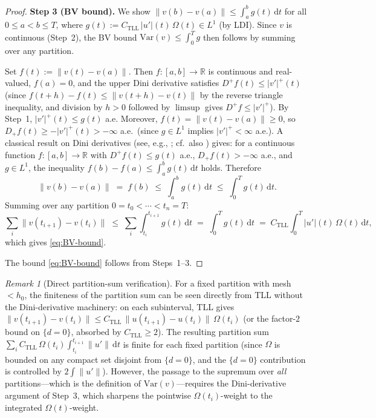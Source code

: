 \documentclass[12pt,a4paper]{article}
\theoremstyle{definition}
\theoremstyle{plain}
\theoremstyle{remark}
\newtheorem{remark}[definition]{Remark}
\newcommand{\Var}{\mathrm{Var}}
\begin{document}
\begin{proof}
\medskip
\noindent
\textbf{Step 3 (BV bound).}\;
We show $\|v(b) - v(a)\| \le \int_a^b g(t)\,\mathrm{d}t$
for all $0 \le a < b \le T$, where
$g(t) := C_{\mathrm{TLL}}\,|u'|(t)\,\Omega(t) \in L^1$
(by LDI).  Since $v$ is continuous (Step~2), the BV bound
$\Var(v) \le \int_0^T g$ then follows by summing over any
partition.

Set $f(t) := \|v(t) - v(a)\|$.  Then $f: [a,b] \to \mathbb{R}$
is continuous and real-valued,
$f(a) = 0$, and the upper Dini derivative satisfies
$D^+ f(t) \le |v'|^+(t)$ (since
$f(t+h) - f(t) \le \|v(t+h)-v(t)\|$ by the reverse triangle
inequality, and division by $h > 0$ followed by
$\limsup$ gives $D^+ f \le |v'|^+$).
By Step~1, $|v'|^+(t) \le g(t)$ a.e.
Moreover, $f(t) = \|v(t) - v(a)\| \ge 0$, so
$D_+ f(t) \ge -|v'|^+(t) > -\infty$ a.e.\ (since $g \in L^1$
implies $|v'|^+ < \infty$ a.e.).  A classical result on Dini
derivatives (see, e.g.,
\cite[Chapter~VII, \S\S\,9--10]{Saks1937}; cf.\ also
\cite[Chapter~3]{AmbrosioFuscoPallara2000}) gives:
for a continuous function $f:[a,b] \to \mathbb{R}$ with
$D^+ f(t) \le g(t)$ a.e., $D_+ f(t) > -\infty$ a.e., and
$g \in L^1$, the inequality
$f(b) - f(a) \le \int_a^b g(t)\,\mathrm{d}t$ holds.
Therefore
\[
  \|v(b) - v(a)\| \;=\; f(b)
  \;\le\; \int_a^b g(t)\,\mathrm{d}t
  \;\le\; \int_0^T g(t)\,\mathrm{d}t.
\]
Summing over any partition $0 = t_0 < \cdots < t_n = T$:
\[
  \sum_i \|v(t_{i+1}) - v(t_i)\|
  \;\le\;
  \sum_i \int_{t_i}^{t_{i+1}} g(t)\,\mathrm{d}t
  \;=\;
  \int_0^T g(t)\,\mathrm{d}t
  \;=\;
  C_{\mathrm{TLL}} \int_0^T |u'|(t)\,\Omega(t)\,\mathrm{d}t,
\]
which gives \eqref{eq:BV-bound}.

\medskip
\noindent
The bound \eqref{eq:BV-bound} follows from Steps~1--3.
\end{proof}

\begin{remark}[Direct partition-sum verification]
\label{rem:partition-sum}
For a fixed partition with mesh $< h_0$, the finiteness of the
partition sum can be seen directly from TLL without the
Dini-derivative machinery: on each subinterval, TLL gives
$\|v(t_{i+1}) - v(t_i)\|
\le C_{\mathrm{TLL}}\,\|u(t_{i+1}) - u(t_i)\|\,\Omega(t_i)$
(or the factor-$2$ bound on $\{d = 0\}$, absorbed by
$C_{\mathrm{TLL}} \ge 2$).  The resulting partition sum
$\sum_i C_{\mathrm{TLL}}\,\Omega(t_i)\int_{t_i}^{t_{i+1}}
\|u'\|\,\mathrm{d}t$ is finite for each fixed partition
(since $\Omega$ is bounded on any compact set disjoint
from $\{d = 0\}$, and the $\{d=0\}$ contribution is
controlled by $2\int\|u'\|$).
However, the passage to the supremum over \emph{all}
partitions---which is the definition of
$\Var(v)$---requires the Dini-derivative argument of
Step~3, which sharpens the pointwise $\Omega(t_i)$-weight
to the integrated $\Omega(t)$-weight.
\end{remark}
\end{document}
